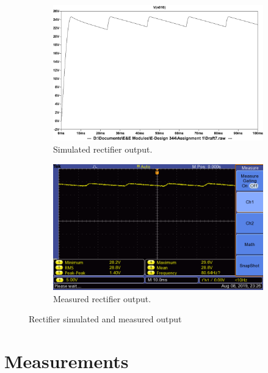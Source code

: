 \begin{figure}[h] 
 \centering
 
    \begin{subfigure}[]{0.55\linewidth}
        \centering
        \includegraphics[width=1.\linewidth]{./Figures/rectifier_simulate.pdf}
        \caption{Simulated rectifier output.}
        \label{fig:rectifier_simulation}
    \end{subfigure}
    \begin{subfigure}[]{0.44\linewidth}
        \centering
        \includegraphics[width=1.\linewidth,clip,trim = 0.3cm 0cm 2.5cm 0cm]{./Figures/rectifier_test}
        \caption{Measured rectifier output.} 
	    \label{fig:rectifier_measurement}
    \end{subfigure}
    
\caption{Rectifier simulated and measured output}
\end{figure}

\section{Measurements} \label{sec:measurements_rectifier}



